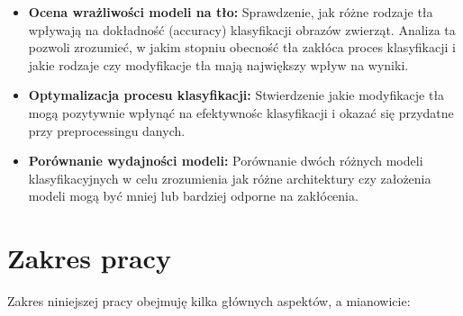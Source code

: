 \begin{itemize}
    \item \textbf{Ocena wrażliwości modeli na tło:} Sprawdzenie, jak różne rodzaje tła wpływają na dokładność (accuracy) klasyfikacji obrazów zwierząt. Analiza ta pozwoli zrozumieć, w jakim stopniu obecność tła zakłóca proces klasyfikacji i
    jakie rodzaje czy modyfikacje tła mają największy wpływ na wyniki.
    \item \textbf{Optymalizacja procesu klasyfikacji:} Stwierdzenie jakie modyfikacje tła mogą pozytywnie wpłynąć na efektywnośc klasyfikacji i okazać się przydatne przy preprocessingu danych.
    \item \textbf{Porównanie wydajności modeli:} Porównanie dwóch różnych modeli klasyfikacyjnych w celu zrozumienia jak różne architektury czy założenia modeli mogą być mniej lub bardziej odporne na zakłócenia.
\end{itemize}

\section*{Zakres pracy}

Zakres niniejszej pracy obejmuję kilka głównych aspektów, a mianowicie:

